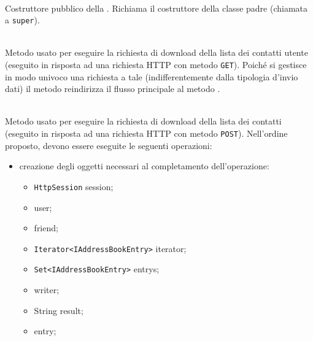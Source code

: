 \begin{description}
	\item{}\\
	Costruttore pubblico della . Richiama il costruttore della classe padre (chiamata a \texttt{super}).
	
	\item{}\\
	Metodo usato per eseguire la richiesta di download della lista dei contatti utente (eseguito in risposta ad una richiesta HTTP con metodo \texttt{GET}). Poiché si gestisce in modo univoco una richiesta a tale  (indifferentemente dalla tipologia d'invio dati) il metodo reindirizza il flusso principale al metodo .
	
	\item{}\\	
	Metodo usato per eseguire la richiesta di download della lista dei contatti (eseguito in risposta ad una richiesta HTTP con metodo \texttt{POST}). Nell'ordine proposto, devono essere eseguite le seguenti operazioni:
	\begin{itemize}
		\item creazione degli oggetti necessari al completamento dell'operazione:
		\begin{itemize}
			\item \texttt{HttpSession} session;
			\item {} user;
			\item {} friend;
			\item \texttt{Iterator<IAddressBookEntry>} iterator;
			\item \texttt{Set<IAddressBookEntry>} entrys;
			\item {} writer;
			\item String result;
			\item {} entry;
		\end{itemize}
		

\end{itemize}
\end{description}

